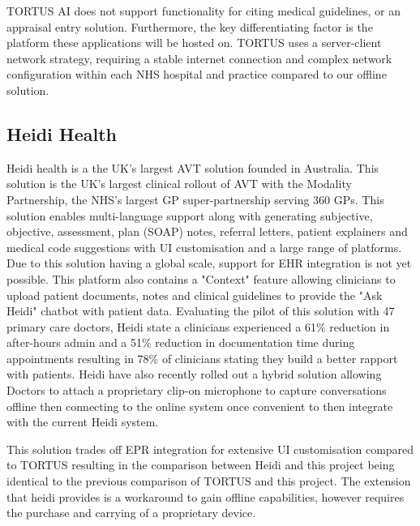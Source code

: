 TORTUS AI does not support functionality for citing medical guidelines, or an appraisal entry solution. Furthermore, the key differentiating factor is the platform these applications will be hosted on. TORTUS uses a server-client network strategy, requiring a stable internet connection and complex network configuration within each NHS hospital and practice compared to our offline solution.

\subsection{Heidi Health}
Heidi health is a the UK's largest AVT solution founded in Australia. This solution is the UK's largest clinical rollout of AVT with the Modality Partnership, the NHS's largest GP super-partnership serving 360 GPs\cite{heidi_modality_2026}. This solution enables multi-language support along with generating subjective, objective, assessment, plan (SOAP) notes, referral letters, patient explainers and medical code suggestions with UI customisation and a large range of platforms. Due to this solution having a global scale, support for EHR integration is not yet possible\cite{deepcura_heidi_review_2026}. This platform also contains a "Context" feature allowing clinicians to upload patient documents, notes and clinical guidelines to provide the "Ask Heidi" chatbot with patient data\cite{heidi_product_2026}. Evaluating the pilot of this solution with 47 primary care doctors, Heidi state a clinicians experienced a 61\% reduction in after-hours admin and a 51\% reduction in documentation time during appointments resulting in 78\% of clinicians stating they build a better rapport with patients\cite{colcol_ai_adoption_2026}. Heidi have also recently rolled out a hybrid solution allowing Doctors to attach a proprietary clip-on microphone to capture conversations offline then connecting to the online system once convenient to then integrate with the current Heidi system\cite{wells_heidi_hardware_2026}. 

This solution trades off EPR integration for extensive UI customisation compared to TORTUS resulting in the comparison between Heidi and this project being identical to the previous comparison of TORTUS and this project. The extension that heidi provides is a workaround to gain offline capabilities, however requires the purchase and carrying of a proprietary device.

